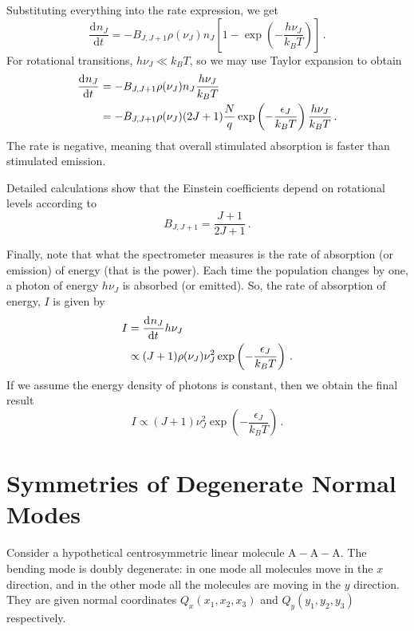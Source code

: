 \documentclass{article}
\theoremstyle{plain}\theoremheaderfont{\normalfont\itshape}\theorembodyfont{\rmfamily}\theoremseparator{.}\newtheorem*{rem}{Remark}\newtheorem*{ex}{Example}\newtheorem*{proof}{Proof}\newtheorem*{altp}{Alternative proof}
\theoremstyle{plain}\theoremheaderfont{\normalfont\bfseries}\theorembodyfont{\rmfamily}\theoremseparator{.}\newtheorem{thm}{Theorem}[section]\newtheorem{lem}[thm]{Lemma}\newtheorem{prop}[thm]{Proposition}\newtheorem*{cor}{Corollary}\newtheorem{defn}[thm]{Definition}\newtheorem{clm}[thm]{Claim}\newtheorem{clminproof}{Claim}\newtheorem{pos}{Postulate}[section]
\theoremstyle{break}\theoremheaderfont{\normalfont\itshape}\theorembodyfont{\rmfamily}\theoremseparator{.\medskip}\newtheorem*{proofskip}{Proof}\newtheorem*{exs}{Examples}\newtheorem*{rems}{Remarks}
\theoremstyle{break}\theoremheaderfont{\normalfont\bfseries}\theorembodyfont{\rmfamily}\theoremseparator{.\medskip}\newtheorem{lemskip}[thm]{Lemma}\newtheorem{defnskip}[thm]{Definition}\newtheorem{propskip}[thm]{Proposition}\newtheorem{thmskip}[thm]{Theorem}
\numberwithin{equation}{section}
\newcommand{\dv}[3][]{\frac{\mathrm{d}^{#1} #2}{{\mathrm{d} #3}^{#1}}}
\begin{document}
    Substituting everything into the rate expression, we get
    \begin{equation}
        \dv{n_J}{t}=-B_{J,J+1}\rho(\nu_J)n_J\left[1-\exp\left(-\frac{h\nu_J}{k_B T}\right)\right]\,.
    \end{equation}
    For rotational transitions, \(h\nu_J\ll k_B T\), so we may use Taylor expansion to obtain
    \begin{align}
        \dv{n_J}{t}&=-B_{J,J+1}\rho(\nu_J)n_J\frac{h\nu_J}{k_B T}\notag\\
        &=-B_{J,J+1}\rho(\nu_J)(2J+1)\frac{N}{q}\exp\left(-\frac{\epsilon_J}{k_B T}\right)\frac{h\nu_J}{k_B T}\,.
    \end{align}
    The rate is negative, meaning that overall stimulated absorption is faster than stimulated emission.

    Detailed calculations show that the Einstein coefficients depend on rotational levels according to
    \begin{equation}
        B_{J,J+1}=\frac{J+1}{2J+1}\,.
    \end{equation}

    Finally, note that what the spectrometer measures is the rate of absorption (or emission) of energy (that is the power). Each time the population changes by one, a photon of energy \(h\nu_J\) is absorbed (or emitted). So, the rate of absorption of energy, \(I\) is given by
    \begin{align}
        I&=\dv{n_J}{t}h\nu_J\notag\\
        &\propto(J+1)\rho(\nu_J)\nu_J^2\exp\left(-\frac{\epsilon_J}{k_B T}\right)\,.
    \end{align}
    If we assume the energy density of photons is constant, then we obtain the final result
    \begin{equation}
        I\propto(J+1)\nu_J^2\exp\left(-\frac{\epsilon_J}{k_B T}\right)\,.
    \end{equation}
    
    \section{Symmetries of Degenerate Normal Modes}\label{Chap:symmetry_degenerate_mode}
    Consider a hypothetical centrosymmetric linear molecule \(\mathrm{A-A-A}\). The bending mode is doubly degenerate: in one mode all molecules move in the \(x\) direction, and in the other mode all the molecules are moving in the \(y\) direction. They are given normal coordinates \(Q_x(x_1,x_2,x_3)\) and \(Q_y(y_1,y_2,y_3)\) respectively.
\end{document}
